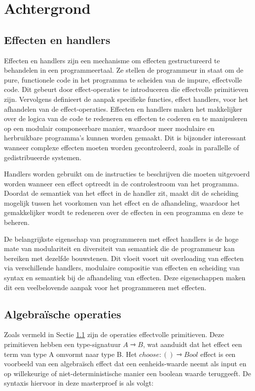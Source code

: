 \chapter{Achtergrond}
\label{hoofdstuk:achtergrond}

\section{Effecten en handlers} \label{sec:achtergrondAlgEff}
Effecten en handlers \cite{Bauer2015} zijn een mechanisme om effecten gestructureerd te behandelen in een programmeertaal. Ze stellen de programmeur in staat om de pure, functionele code in het programma te scheiden van de impure, effectvolle code. Dit gebeurt door effect-operaties te introduceren die effectvolle primitieven zijn. Vervolgens definieert de aanpak specifieke functies, effect handlers, voor het afhandelen van de effect-operaties. Effecten en handlers maken het makkelijker over de logica van de code te redeneren en effecten te coderen en te manipuleren op een modulair componeerbare manier, waardoor meer modulaire en herbruikbare programma's kunnen worden gemaakt. Dit is bijzonder interessant wanneer complexe effecten moeten worden gecontroleerd, zoals in parallelle of gedistribueerde systemen. \newline

Handlers worden gebruikt om de instructies te beschrijven die moeten uitgevoerd worden wanneer een effect optreedt in de controlestroom van het programma. Doordat de semantiek van het effect in de handler zit, maakt dit de scheiding mogelijk tussen het voorkomen van het effect en de afhandeling, waardoor het gemakkelijker wordt te redeneren over de effecten in een programma en deze te beheren. \newline

De belangrijkste eigenschap van programmeren met effect handlers is de hoge mate van modulariteit en diversiteit van semantiek die de programmeur kan bereiken met dezelfde bouwstenen. Dit vloeit voort uit overloading van effecten via verschillende handlers, modulaire compositie van effecten en scheiding van syntax en semantiek bij de afhandeling van effecten. Deze eigenschappen maken dit een veelbelovende aanpak voor het programmeren met effecten. 

\section{Algebraïsche operaties}
Zoals vermeld in Sectie \ref{sec:achtergrondAlgEff} zijn de operaties effectvolle primitieven. Deze primitieven hebben een type-signatuur $A \rightarrowtriangle B$, wat aanduidt dat het effect een term van type A omvormt naar type B. Het $choose:() \rightarrowtriangle Bool$ effect is een voorbeeld van een algebraïsch effect dat een eenheids-waarde neemt als input en op willekeurige of niet-deterministische manier een boolean waarde teruggeeft. De syntaxis hiervoor in deze masterproef is als volgt:

